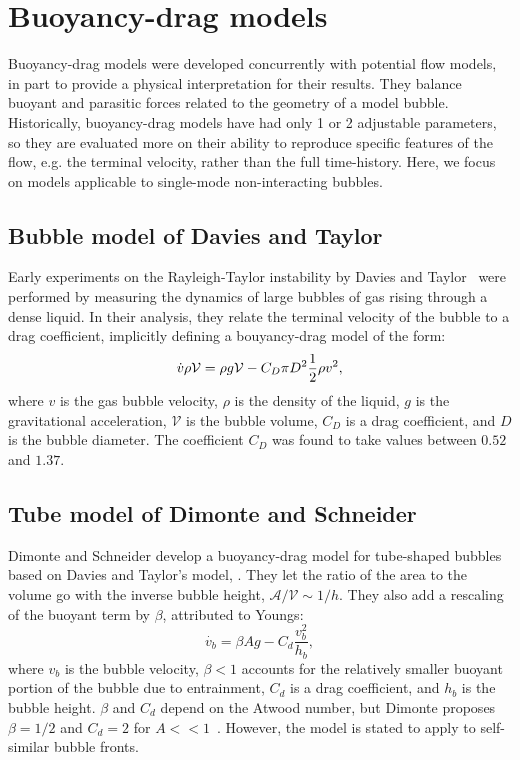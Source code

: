 \section{Buoyancy-drag models}

Buoyancy-drag models were developed concurrently with potential flow models, in part to provide a physical interpretation for their results.
They balance buoyant and parasitic forces related to the geometry of a model bubble.
Historically, buoyancy-drag models have had only 1 or 2 adjustable parameters, so they are evaluated more on their ability to reproduce specific features of the flow, e.g. the terminal velocity, rather than the full time-history.
Here, we focus on models applicable to single-mode non-interacting bubbles.

\subsection{Bubble model of Davies and Taylor}

Early experiments on the Rayleigh-Taylor instability by Davies and Taylor~\cite{Davies1950a} were performed by measuring the dynamics of large bubbles of gas rising through a dense liquid.
In their analysis, they relate the terminal velocity of the bubble to a drag coefficient, implicitly defining a bouyancy-drag model of the form:
\begin{equation} \elabel{dtbd}
\dot{v} \rho \mathcal{V} = \rho g \mathcal{V} - C_D \pi D^2 \frac{1}{2} \rho v^2,
\end{equation}
where $v$ is the gas bubble velocity,
$\rho$ is the density of the liquid,
$g$ is the gravitational acceleration,
$\mathcal{V}$ is the bubble volume,
$C_D$ is a drag coefficient, and
$D$ is the bubble diameter.
The coefficient $C_D$ was found to take values between $0.52$ and $1.37$.

\subsection{Tube model of Dimonte and Schneider}

Dimonte and Schneider develop a buoyancy-drag model for tube-shaped bubbles~\cite{Dimonte1996,Dimonte2000a} based on Davies and Taylor's model, .
They let the ratio of the area to the volume go with the inverse bubble height, $\mathcal{A} / \mathcal{V} \sim 1/h$.
They also add a rescaling of the buoyant term by $\beta$, attributed to Youngs:
\begin{equation}
\dot{v_b}  = \beta A g - C_d \frac{v_b^2}{h_b}, 
\end{equation}
where $v_b$ is the bubble velocity,
$\beta < 1$ accounts for the relatively smaller buoyant portion of the bubble due to entrainment,
$C_d$ is a drag coefficient, and
$h_b$ is the bubble height.
$\beta$ and $C_d$ depend on the Atwood number, but Dimonte proposes $\beta = 1/2$ and $C_d = 2$ for $A << 1$~\cite{Dimonte2000}.
However, the model is stated to apply to self-similar bubble fronts.

